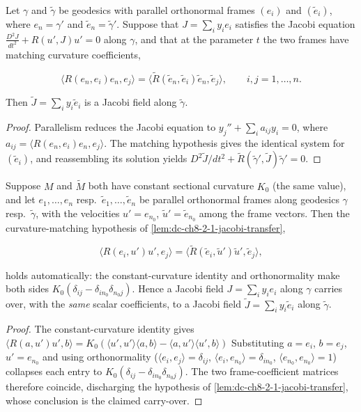 \begin{lemma}
  \label{lem:dc-ch8-2-1-jacobi-transfer}
  \leanok
  Let $\gamma$ and $\tilde\gamma$ be geodesics with parallel orthonormal frames
  $(e_i)$ and $(\tilde e_i)$, where $e_n=\gamma'$ and
  $\tilde e_n=\tilde\gamma'$. Suppose that $J=\sum_i y_i e_i$ satisfies the Jacobi
  equation $\tfrac{D^2 J}{dt^2}+R(u',J)u'=0$ along $\gamma$, and that at the parameter
  $t$ the two frames have matching curvature coefficients,

  $$
  \langle R(e_n,e_i)e_n,e_j\rangle=\langle\tilde R(\tilde e_n,\tilde e_i)\tilde e_n,\tilde e_j\rangle,
  \qquad i,j=1,\dots,n.
  $$

  Then $\tilde J=\sum_i y_i\tilde e_i$ is a Jacobi field along $\tilde\gamma$.
\end{lemma}
\begin{proof}
  \leanok
\sketch
  Parallelism reduces the Jacobi equation to
  $y_j''+\sum_i a_{ij}y_i=0$, where
  $a_{ij}=\langle R(e_n,e_i)e_n,e_j\rangle$. The matching hypothesis gives the
  identical system for $(\tilde e_i)$, and reassembling its solution yields
  $D^2\tilde J/dt^2+\tilde R(\tilde\gamma',\tilde J)\tilde\gamma'=0$.
\end{proof}

\begin{lemma}
  \label{lem:dc-ch8-2-1-jacobi-transfer-const}
  \leanok
  Suppose $M$ and $\tilde M$ both have constant sectional curvature $K_0$ (the same value),
  and let $e_1,\dots,e_n$ resp.\ $\tilde e_1,\dots,\tilde e_n$ be parallel orthonormal frames
  along geodesics $\gamma$ resp.\ $\tilde\gamma$, with the velocities $u'=e_{n_0}$,
  $\tilde u'=\tilde e_{n_0}$ among the frame vectors. Then the curvature-matching hypothesis
  of \cref{lem:dc-ch8-2-1-jacobi-transfer},

  $$
  \langle R(e_i,u')u',e_j\rangle=\langle\tilde R(\tilde e_i,\tilde u')\tilde u',\tilde e_j\rangle,
  $$

  holds automatically: the constant-curvature identity and orthonormality make both sides
  $K_0(\delta_{ij}-\delta_{i n_0}\delta_{n_0 j})$. Hence a Jacobi field $J=\sum_i y_i e_i$ along
  $\gamma$ carries over, with the \emph{same} scalar coefficients, to a Jacobi field
  $\tilde J=\sum_i y_i\tilde e_i$ along $\tilde\gamma$.
\end{lemma}
\begin{proof}
  \leanok
\sketch
  The constant-curvature identity gives
  $\langle R(a,u')u',b\rangle=K_0(\langle u',u'\rangle\langle a,b\rangle-\langle a,u'\rangle\langle u',b\rangle)$
  Substituting
  $a=e_i$, $b=e_j$, $u'=e_{n_0}$ and using orthonormality
  ($\langle e_i,e_j\rangle=\delta_{ij}$, $\langle e_i,e_{n_0}\rangle=\delta_{i n_0}$,
  $\langle e_{n_0},e_{n_0}\rangle=1$) collapses each entry to
  $K_0(\delta_{ij}-\delta_{i n_0}\delta_{n_0 j})$. The two frame-coefficient
  matrices therefore coincide, discharging the hypothesis of
  \cref{lem:dc-ch8-2-1-jacobi-transfer}, whose conclusion is the claimed carry-over.
\end{proof}

